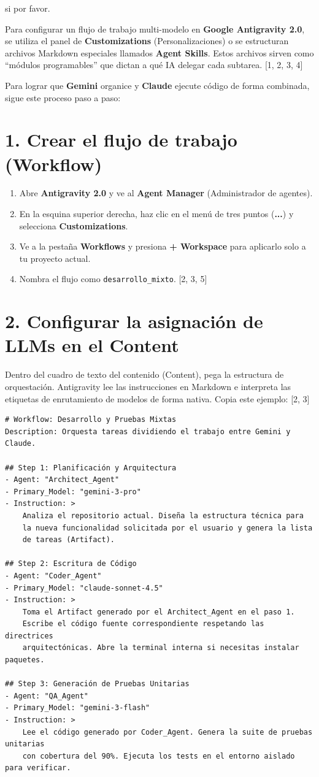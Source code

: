 \documentclass[12pt, a4paper]{article}
\begin{document}
si por favor.

Para configurar un flujo de trabajo multi-modelo en \textbf{Google Antigravity 2.0}, se utiliza el panel de \textbf{Customizations} (Personalizaciones) o se estructuran archivos Markdown especiales llamados \textbf{Agent Skills}. Estos archivos sirven como ``módulos programables'' que dictan a qué IA delegar cada subtarea. [1, 2, 3, 4]

Para lograr que \textbf{Gemini} organice y \textbf{Claude} ejecute código de forma combinada, sigue este proceso paso a paso:

\section*{1. Crear el flujo de trabajo (Workflow)}

\begin{enumerate}
    \item Abre \textbf{Antigravity 2.0} y ve al \textbf{Agent Manager} (Administrador de agentes).
    \item En la esquina superior derecha, haz clic en el menú de tres puntos (\textbf{...}) y selecciona \textbf{Customizations}.
    \item Ve a la pestaña \textbf{Workflows} y presiona \textbf{+ Workspace} para aplicarlo solo a tu proyecto actual.
    \item Nombra el flujo como \texttt{desarrollo\_mixto}. [2, 3, 5]
\end{enumerate}

\section*{2. Configurar la asignación de LLMs en el Content}

Dentro del cuadro de texto del contenido (Content), pega la estructura de orquestación. Antigravity lee las instrucciones en Markdown e interpreta las etiquetas de enrutamiento de modelos de forma nativa. Copia este ejemplo: [2, 3]

\begin{verbatim}
# Workflow: Desarrollo y Pruebas Mixtas
Description: Orquesta tareas dividiendo el trabajo entre Gemini y Claude.

## Step 1: Planificación y Arquitectura
- Agent: "Architect_Agent"
- Primary_Model: "gemini-3-pro"
- Instruction: >
    Analiza el repositorio actual. Diseña la estructura técnica para
    la nueva funcionalidad solicitada por el usuario y genera la lista
    de tareas (Artifact).

## Step 2: Escritura de Código
- Agent: "Coder_Agent"
- Primary_Model: "claude-sonnet-4.5"
- Instruction: >
    Toma el Artifact generado por el Architect_Agent en el paso 1.
    Escribe el código fuente correspondiente respetando las directrices
    arquitectónicas. Abre la terminal interna si necesitas instalar paquetes.

## Step 3: Generación de Pruebas Unitarias
- Agent: "QA_Agent"
- Primary_Model: "gemini-3-flash"
- Instruction: >
    Lee el código generado por Coder_Agent. Genera la suite de pruebas unitarias
    con cobertura del 90%. Ejecuta los tests en el entorno aislado para verificar.
\end{verbatim}
\end{document}
